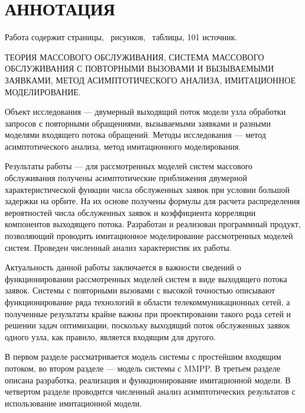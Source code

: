 \section*{\normalsize\centering АННОТАЦИЯ}
Работа содержит \pageref{LastPage} страницы, \totalfigures\ рисунков, \totaltables\ таблицы, 101 источник.
 
ТЕОРИЯ МАССОВОГО ОБСЛУЖИВАНИЯ, СИСТЕМА МАССОВОГО ОБСЛУЖИВАНИЯ С ПОВТОРНЫМИ ВЫЗОВАМИ И ВЫЗЫВАЕМЫМИ ЗАЯВКАМИ, МЕТОД АСИМПТОТИЧЕСКОГО АНАЛИЗА, ИМИТАЦИОННОЕ МОДЕЛИРОВАНИЕ.

Объект исследования --- двумерный выходящий поток модели узла обработки запросов с повторными обращениями, вызываемыми заявками и разными моделями входящего потока обращений.
Методы исследования --- метод асимптотического анализа, метод имитационного моделирования. 

Результаты работы --- для рассмотренных моделей систем массового обслуживания получены асимптотические приближения двумерной характеристической функции числа обслуженных заявок при условии большой задержки на орбите. На их основе получены формулы для расчета распределения вероятностей числа обслуженных заявок и коэффициента корреляции компонентов выходящего потока. Разработан и реализован программный продукт, позволяющий проводить имитационное моделирование рассмотренных моделей систем. Проведен численный анализ характеристик их работы.

Актуальность данной работы заключается в важности сведений о функционировании рассмотренных моделей систем в виде выходящего потока заявок. Системы с повторными вызовами с высокой точностью описывают функционирование ряда технологий в области телекоммуникационных сетей, а полученные результаты крайне важны при проектировании такого рода сетей и решении задач оптимизации, поскольку выходящий поток обслуженных заявок одного узла, как правило, является входящим для другого.

В первом разделе рассматривается модель системы с простейшим входящим потоком, во втором разделе --- модель системы с MMPP. В третьем разделе описана разработка, реализация и функционирование имитационной модели. В четвертом разделе проводится численный анализ асимптотических результатов с использование имитационной модели.

\thispagestyle{empty}\addtocounter{page}{-1} %
\clearpage